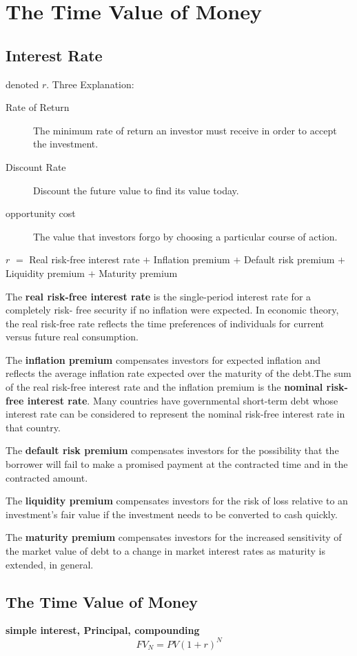 \chapter{The Time Value of Money}
\section{Interest Rate}
denoted $r$. Three Explanation:
\begin{description}
\item[Rate of Return] The minimum rate of return an investor must receive in order to accept the
investment.
\item[Discount Rate] Discount the future value to find its value today.
\item[opportunity cost] The value that
investors forgo by choosing a particular course of action.
\end{description}
$r$ $=$ Real risk-free interest rate $+$ Inflation premium $+$ Default risk premium $+$
Liquidity premium $+$ Maturity premium\par

The \textbf{real risk-free interest rate} is the single-period interest rate for a completely risk-
free security if no inflation were expected. In economic theory, the real risk-free rate
reflects the time preferences of individuals for current versus future real consumption.

The \textbf{inflation premium} compensates investors for expected inflation and reflects the
average inflation rate expected over the maturity of the debt.The sum of the real risk-free interest rate and the inflation premium is the
\textbf{nominal risk-free interest rate}. Many countries have governmental short-term debt
whose interest rate can be considered to represent the nominal risk-free interest rate in
that country.

The \textbf{default risk premium} compensates investors for the possibility that the borrower
will fail to make a promised payment at the contracted time and in the contracted amount.

The \textbf{liquidity premium} compensates investors for the risk of loss relative to an
investment’s fair value if the investment needs to be converted to cash quickly.

The \textbf{maturity premium} compensates investors for the increased sensitivity of the market
value of debt to a change in market interest rates as maturity is extended, in general.

\section{The Time Value of Money}
\textbf{simple interest, Principal, compounding}
\begin{equation}
    FV_N = PV(1 + r)^N
\end{equation}
